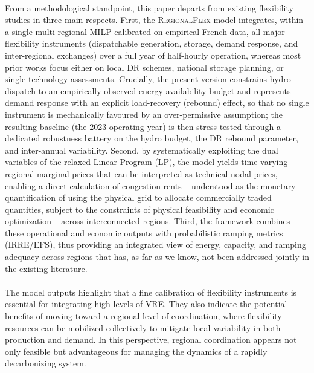 \documentclass[12pt]{article}
\begin{document}
\paragraph{}
From a methodological standpoint, this paper departs from existing flexibility studies in three main respects. First, the \textsc{RegionalFlex} model integrates, within a single multi-regional MILP calibrated on empirical French data, all major flexibility instruments (dispatchable generation, storage, demand response, and inter-regional exchanges) over a full year of half-hourly operation, whereas most prior works focus either on local DR schemes, national storage planning, or single-technology assessments. Crucially, the present version constrains hydro dispatch to an empirically observed energy-availability budget and represents demand response with an explicit load-recovery (rebound) effect, so that no single instrument is mechanically favoured by an over-permissive assumption; the resulting baseline (the 2023 operating year) is then stress-tested through a dedicated robustness battery on the hydro budget, the DR rebound parameter, and inter-annual variability. Second, by systematically exploiting the dual variables of the relaxed Linear Program (LP), the model yields time-varying regional marginal prices that can be interpreted as technical nodal prices, enabling a direct calculation of congestion rents -- understood as the monetary quantification of using the physical grid to allocate commercially traded quantities, subject to the constraints of physical feasibility and economic optimization -- across interconnected regions. Third, the framework combines these operational and economic outputs with probabilistic ramping metrics (IRRE/EFS), thus providing an integrated view of energy, capacity, and ramping adequacy across regions that has, as far as we know, not been addressed jointly in the existing literature. 

\paragraph{} The model outputs highlight that a fine calibration of flexibility instruments is essential for integrating high levels of VRE. They also indicate the potential benefits of moving toward a regional level of coordination, where flexibility resources can be mobilized collectively to mitigate local variability in both production and demand. In this perspective, regional coordination appears not only feasible but advantageous for managing the dynamics of a rapidly decarbonizing system. 
\end{document}
